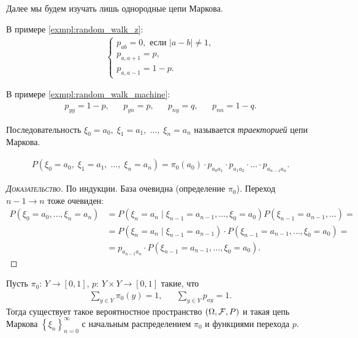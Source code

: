 \documentclass[../main.tex]{subfiles}
\begin{document}
Далее мы будем изучать лишь однородные цепи Маркова.

\begin{remrk}
 В примере \eqref{exmpl:random_walk_z}:
 \begin{align*}
  \begin{cases}
   p_{ab} = 0, \text{ если } \left| a-b \right| \neq 1, \\
   p_{a,a+1} = p, \\
   p_{a,a-1} = 1-p.
  \end{cases} 
 \end{align*}

 В примере \eqref{exmpl:random_walk_machine}:
 \begin{align*}
  p_{yy} = 1-p, && p_{yn} = p, && p_{ny} = q, && p_{nn} = 1-q.
 \end{align*}
\end{remrk}

\begin{df}
 Последовательность $ \xi_0 = a_0,\; \xi_1 = a_1,\; \ldots,\; \xi_n = a_n $ называется \textit{траекторией} цепи Маркова.
\end{df}

\begin{thm}
 \begin{align*}
  P(\xi_0 = a_0,\; \xi_1 = a_1,\; \ldots,\; \xi_n = a_n) = \pi_0(a_0) \cdot  p_{a_0 a_1} \cdot p_{a_1 a_2} \cdot  \ldots \cdot p_{a_{n-1}a_n}.
 \end{align*}
 \begin{proof}[\normalfont\textsc{Доказательство}]
  По индукции. База очевидна (определение $ \pi_0 $). Переход $ n-1 \to n $ тоже очевиден:
  \begin{align*}
   P(\xi_0 = a_0, \ldots, \xi_n = a_n) &= P(\xi_n = a_n \mid \xi_{n-1} = a_{n-1},\ldots,\xi_0 = a_0) P(\xi_{n-1} = a_{n-1},\ldots) = \\
   &= P(\xi_n = a_n \mid \xi_{n-1} = a_{n-1}) \cdot P(\xi_{n-1} = a_{n-1}, \ldots, \xi_0 = a_0) = \\
   &= p_{a_{n-1}a_n} \cdot P(\xi_{n-1} = a_{n-1},\ldots,\xi_0 = a_0).
  \end{align*}
 \end{proof}
\end{thm}

\begin{thm}
 Пусть $ \pi_0 \colon\, Y \to [0,1] $, $ p \colon\, Y \times Y \to [0,1] $ такие, что
 \begin{align*}
  \sum_{y \in Y} \pi_0(y) = 1, && \sum_{y \in Y} p_{ay} = 1.
 \end{align*} Тогда существует такое вероятностное пространство $ (\Omega,\mathcal F,P) $ и такая цепь Маркова $ \left\{\xi_n \right\}_{n=0}^{\infty} $ с начальным распределением $ \pi_0 $ и функциями перехода $ p $.
\end{thm}
\end{document}
